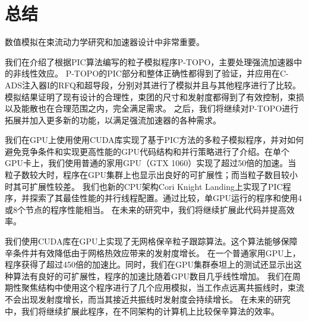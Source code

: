 
\chapter{总结}
\label{chap:conclusion}

数值模拟在束流动力学研究和加速器设计中非常重要。


我们在介绍了根据PIC算法编写的粒子模拟程序P-TOPO，主要处理强流加速器中的非线性效应。
P-TOPO的PIC部分和整体正确性都得到了验证，并应用在C-ADS注入器I的RFQ和超导段，分别对其进行了模拟并且与其他程序进行了比较。
模拟结果证明了现有设计的合理性，束团的尺寸和发射度都得到了有效控制，束损以及能散也在合理范围之内，完全满足需求。
之后，我们将继续对P-TOPO进行拓展并加入更多新的功能，以满足强流加速器的各种需求。

我们在GPU上使用使用CUDA库实现了基于PIC方法的多粒子模拟程序，并对如何避免竞争条件和实现更高性能的GPU代码结构和并行策略进行了介绍。在单个GPU卡上，我们使用普通的家用GPU（GTX 1060）实现了超过50倍的加速。当粒子数较大时，程序在GPU集群上也显示出良好的可扩展性；而当粒子数目较小时其可扩展性较差。
我们也新的CPU架构Cori Knight Landing上实现了PIC程序，并探索了其最佳性能的并行线程配置。通过比较，单GPU运行的程序和使用4或8个节点的程序性能相当。
在未来的研究中，我们将继续扩展此代码并提高效率。

我们使用CUDA库在GPU上实现了无网格保辛粒子跟踪算法。这个算法能够保障辛条件并有效降低由于网格热效应带来的发射度增长。
在一个普通家用GPU上，程序获得了超过450倍的加速比。同时，我们在GPU集群泰坦上的测试还显示出这种算法有良好的可扩展性，程序的加速比随着GPU数目几乎线性增加。
我们在周期性聚焦结构中使用这个程序进行了几个应用模拟，当工作点远离共振线时，束流不会出现发射度增长，而当其接近共振线时发射度会持续增长。
在未来的研究中，我们将继续扩展此程序，在不同架构的计算机上比较保辛算法的效率。